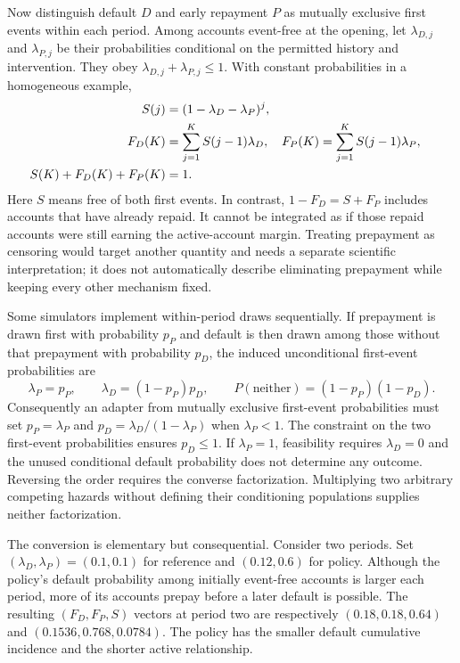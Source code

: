 Now distinguish default $D$ and early repayment $P$ as mutually exclusive
first events within each period. Among accounts event-free at the opening,
let $\lambda_{D,j}$ and $\lambda_{P,j}$ be their probabilities conditional on
the permitted history and intervention. They obey
$\lambda_{D,j}+\lambda_{P,j}\leq1$. With constant probabilities in a homogeneous
example,
\begin{align}
 S(j)&=(1-\lambda_D-\lambda_P)^j,\notag\\
 F_D(K)&=\sum_{j=1}^{K}S(j-1)\lambda_D,&
 F_P(K)&=\sum_{j=1}^{K}S(j-1)\lambda_P,\notag\\
 S(K)+F_D(K)+F_P(K)&=1.
 \label{exec17:s5-first-events}
\end{align}
Here $S$ means free of both first events. In contrast,
$1-F_D=S+F_P$ includes accounts that have already repaid. It cannot be
integrated as if those repaid accounts were still earning the active-account
margin. Treating prepayment as censoring would target another quantity and
needs a separate scientific interpretation; it does not automatically
describe eliminating prepayment while keeping every other mechanism fixed.

Some simulators implement within-period draws sequentially. If prepayment is
drawn first with probability $p_P$ and default is then drawn among those
without that prepayment with probability $p_D$, the induced unconditional
first-event probabilities are
\begin{equation}
 \lambda_P=p_P,\qquad \lambda_D=(1-p_P)p_D,
 \qquad P(\text{neither})=(1-p_P)(1-p_D).
 \label{exec17:s5-ordered-conversion}
\end{equation}
Consequently an adapter from mutually exclusive first-event probabilities
must set $p_P=\lambda_P$ and
$p_D=\lambda_D/(1-\lambda_P)$ when $\lambda_P<1$. The constraint on the
two first-event probabilities ensures $p_D\leq1$. If $\lambda_P=1$, feasibility
requires $\lambda_D=0$ and the unused conditional default probability does not
determine any outcome. Reversing the order requires the converse
factorization. Multiplying two arbitrary competing hazards without defining
their conditioning populations supplies neither factorization.

The conversion is elementary but consequential. Consider two periods. Set
$(\lambda_D,\lambda_P)=(0.1,0.1)$ for reference and $(0.12,0.6)$ for policy.
Although the policy's default probability among initially event-free accounts
is larger each period, more of its accounts prepay before a later default is
possible. The resulting $(F_D,F_P,S)$ vectors at period two are respectively
$(0.18,0.18,0.64)$ and $(0.1536,0.768,0.0784)$. The policy has the smaller
default cumulative incidence and the shorter active relationship.

